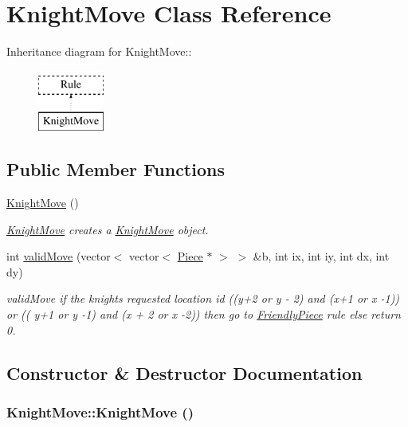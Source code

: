 \hypertarget{classKnightMove}{
\section{KnightMove Class Reference}
\label{classKnightMove}
}
Inheritance diagram for KnightMove::\begin{figure}[H]
\begin{center}
\leavevmode
\includegraphics[height=2cm]{classKnightMove}
\end{center}
\end{figure}
\subsection*{Public Member Functions}
\begin{DoxyCompactItemize}
\item 
\hyperlink{classKnightMove_af312e58dbda8f4c6e241d70cf24f6b1a}{KnightMove} ()
\begin{DoxyCompactList}\small\item\em \hyperlink{classKnightMove}{KnightMove} creates a \hyperlink{classKnightMove}{KnightMove} object. \item\end{DoxyCompactList}\item 
int \hyperlink{classKnightMove_a0bf2d52e9202f4662d7920321bd0c81a}{validMove} (vector$<$ vector$<$ \hyperlink{classPiece}{Piece} $\ast$ $>$ $>$ \&b, int ix, int iy, int dx, int dy)
\begin{DoxyCompactList}\small\item\em validMove if the knights requested location id ((y+2 or y -\/ 2) and (x+1 or x -\/1)) or (( y+1 or y -\/1) and (x + 2 or x -\/2)) then go to \hyperlink{classFriendlyPiece}{FriendlyPiece} rule else return 0. \item\end{DoxyCompactList}\end{DoxyCompactItemize}


\subsection{Constructor \& Destructor Documentation}
\hypertarget{classKnightMove_af312e58dbda8f4c6e241d70cf24f6b1a}{
\subsubsection[{KnightMove}]{\setlength{\rightskip}{0pt plus 5cm}KnightMove::KnightMove ()}}
\label{classKnightMove_af312e58dbda8f4c6e241d70cf24f6b1a}


